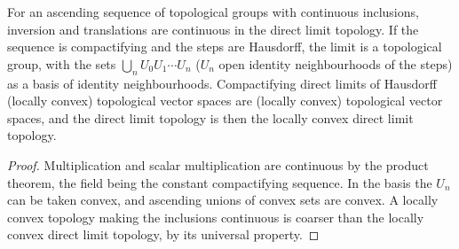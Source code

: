 \begin{theorem}
  \label{thm:top-dl-groups}
  \leanok
  For an ascending sequence of topological groups with continuous inclusions, inversion and
  translations are continuous in the direct limit topology. If the sequence is compactifying and
  the steps are Hausdorff, the limit is a topological group, with the sets
  $\bigcup_n U_0 U_1 \cdots U_n$ ($U_n$ open identity neighbourhoods of the steps) as a basis of
  identity neighbourhoods. Compactifying direct limits of Hausdorff (locally convex) topological
  vector spaces are (locally convex) topological vector spaces, and the direct limit topology is
  then the locally convex direct limit topology.
\end{theorem}

\begin{proof}
  \leanok
  Multiplication and scalar multiplication are continuous by the product theorem, the field being
  the constant compactifying sequence. In the basis the $U_n$ can be taken convex, and ascending
  unions of convex sets are convex. A locally convex topology making the inclusions continuous is
  coarser than the locally convex direct limit topology, by its universal property.
\end{proof}

